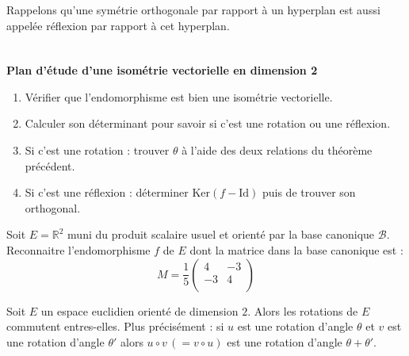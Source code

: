 \documentclass[a4paper,10pt]{report}
\begin{document}
\begin{rem} Rappelons qu'une symétrie orthogonale par rapport à un hyperplan est aussi appelée réflexion par rapport à cet hyperplan.
\end{rem}

\begin{preuve}
\vspace{14cm}
\end{preuve}

\newpage

$\phantom{tes}$

\vspace{15cm}



\begin{center}
\textbf{Plan d'étude d'une isométrie vectorielle en dimension 2}
\end{center}

\begin{enumerate}
\item Vérifier que l'endomorphisme est bien une isométrie vectorielle.
\item Calculer son déterminant pour savoir si c'est une rotation ou une réflexion.
\item Si c'est une rotation : trouver $\theta$ à l'aide des deux relations du théorème précédent.
\item Si c'est une réflexion : déterminer $\textrm{Ker}(f-\textrm{Id})$ puis de trouver son orthogonal.
\end{enumerate}

\medskip

\begin{ex} Soit $E= \mathbb{R}^2$ muni du produit scalaire usuel et orienté par la base canonique $\mathcal{B}$. Reconnaitre l'endomorphisme $f$ de $E$ dont la matrice dans la base canonique est :
$$ M =\dfrac{1}{5} \begin{pmatrix}
4 & -3 \\
-3 & 4\\
\end{pmatrix}$$

\vspace{6cm}
\end{ex}

\begin{prop} Soit $E$ un espace euclidien orienté de dimension $2$. Alors les rotations de $E$ commutent entres-elles. Plus précisément : si $u$ est une rotation d'angle $\theta$ et $v$ est une rotation d'angle $\theta'$ alors $u \circ v \, (= v \circ u)$ est une rotation d'angle $\theta + \theta'$.
\end{prop}
\end{document}
